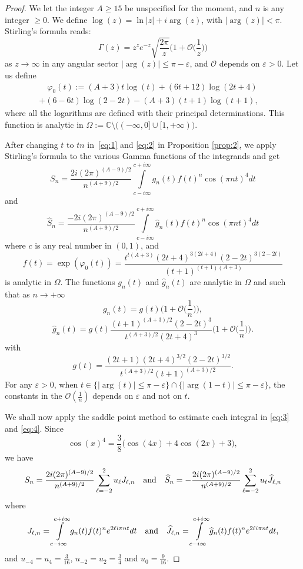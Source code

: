\documentclass[reqno,12pt]{article}
\theoremstyle{remark}
\begin{document}
\begin{proof} We let the integer $A\ge 15$ be unspecified for the moment, and $n$ is any integer $\ge 0$. 
We define $\log(z)=\ln\vert z\vert+i\arg(z)$, with $\vert \arg(z)\vert<\pi$. Stirling's formula reads:
$$
\Gamma(z)=z^z e^{-z}\sqrt{\frac{2\pi}z} \Big(1+\mathcal{O}\big(\frac1z\big)\Big)
$$
as $z\to \infty$ in any angular sector $\vert \arg(z)\vert\le \pi-\varepsilon$, and $\mathcal{O}$ depends on $\varepsilon>0$. Let us define  
\begin{multline*}
\quad \varphi_0(t):=(A+3)t\log(t)+(6t+12)\log(2t+4)\\
+(6-6t)\log(2-2t)-(A+3)(t+1)\log(t+1),\quad
\end{multline*}
where all the logarithms are defined with their principal determinations. This function is analytic in $\Omega:=\mathbb C\setminus \big((-\infty,0] \cup [1,+\infty)\big)$.

After changing $t$ to $tn$ in~\eqref{eq:1} and \eqref{eq:2} in Proposition \ref{prop:2}, we apply Stirling's formula to the various Gamma functions of the integrands and get
\begin{equation}\label{eq:3}
S_n= \frac{2i(2\pi)^{(A-9)/2}}{n^{(A+9)/2}}\int\limits_{c-i\infty}^{c+i\infty} g_n(t) f(t)^n \cos(\pi n t)^4 dt
\end{equation}
and 
\begin{equation}\label{eq:4}
\widehat{S}_n= 
\frac{-2i(2\pi)^{(A-9)/2}}{n^{(A+9)/2}}
\int\limits_{c-i\infty}^{c+i\infty} \widehat{g}_n(t) f(t)^n \cos(\pi n t)^4 dt
\end{equation}
where $c$ is any real number in $(0,1)$, and 
$$
f(t)=\exp(\varphi_0(t))=\frac{t^{t(A+3)}(2t+4)^{3(2t+4)}(2-2t)^{3(2-2t)}}{(t+1)^{(t+1)(A+3)}}
$$
is analytic in  $\Omega$. 
The functions $g_n(t)$ and $\widehat{g}_n(t)$ are analytic in $\Omega$ and such that as $n\to +\infty$
$$
g_n(t)=g(t)\Big(1+\mathcal{O}\Big(\frac 1n\Big)\Big),
$$
$$
\widehat{g}_n(t)=g(t)\frac{(t+1)^{(A+3)/2}(2-2t)^3}{t^{(A+3)/2}(2t+4)^3}\Big(1+\mathcal{O}\Big(\frac 1n\Big)\Big).
$$
with 
$$
g(t)=\frac{(2t+1)(2t+4)^{3/2}(2-2t)^{3/2}}
{t^{(A+3)/2}(t+1)^{(A+3)/2}}.
$$
For any $\varepsilon>0$, when $t\in \{\vert\arg(t)\vert\le \pi-\varepsilon \} \cap \{\vert\arg(1-t)\vert\le \pi-\varepsilon \}$,  the constants in the  $\mathcal{O}(\frac 1n)$ depends on $\varepsilon$ and not on $t$.  

\medskip

We shall now apply the saddle point method to estimate each integral in \eqref{eq:3} and \eqref{eq:4}. Since 
$$
\cos(x)^4= \frac38\big(\cos(4x) + 4\cos(2x) + 3\big),
$$
we have
\begin{equation}\label{eq:16}
S_n=\frac{2i(2\pi)^{(A-9)/2}}{n^{(A+9)/2}}\sum_{\ell=-2}^2 u_\ell J_{\ell,n} \quad
\textup{and} \quad
\widehat{S}_n=-\frac{2i(2\pi)^{(A-9)/2}}{n^{(A+9)/2}}\sum_{\ell=-2}^2 u_\ell \widehat{J}_{\ell,n}
\end{equation}
where
$$
J_{\ell,n} = \int\limits_{c-i\infty}^{c+i\infty} g_n(t) f(t)^n e^{2\ell i\pi n t}dt \quad
\textup{and} \quad
\widehat{J}_{\ell,n} = \int\limits_{c-i\infty}^{c+i\infty} \widehat{g}_n(t) f(t)^n e^{2\ell i\pi n t}dt,
$$
and $u_{-4}=u_4=\frac{3}{16}$, $u_{-2}=u_2=\frac{3}{4}$ and $u_0=\frac{9}{16}$.


\end{proof}
\end{document}
